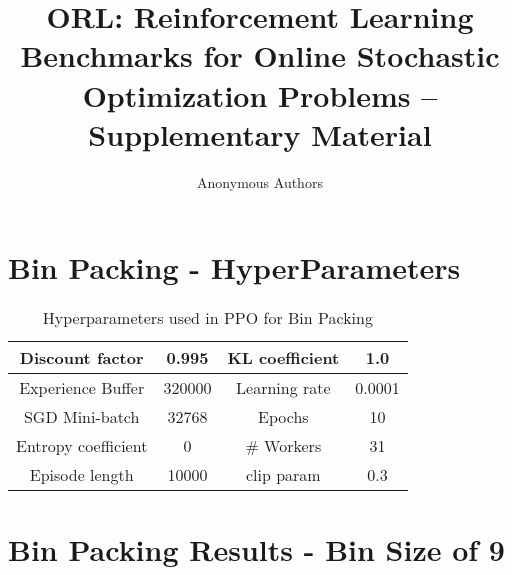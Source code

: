\documentclass[letterpaper]{article} %
\title{ORL: Reinforcement Learning Benchmarks for Online Stochastic Optimization Problems -- Supplementary Material}
\author{Anonymous Authors}
\begin{document}
	
\maketitle

	\section{Bin Packing - HyperParameters}
\label{appendix:bin_size_hp}
\begin{table}[h!]
	\resizebox{\columnwidth}{!}
	{
		\centering
		\begin{tabular}{ |c|c|c|c| } 
			\hline
			Discount factor & 0.995 & KL coefficient & 1.0 \\
			\hline
			Experience Buffer & 320000 & Learning rate & 0.0001 \\
			\hline	
			SGD Mini-batch & 32768 & Epochs & 10 \\
			\hline
			Entropy coefficient & 0 & \# Workers & 31 \\
			\hline
			Episode length & 10000 & clip param & 0.3 \\
			\hline
		\end{tabular}
	}
	\caption{Hyperparameters used in PPO for Bin Packing}
	\label{table:bin_packing_hyperparam}
	\vspace{-1em}
\end{table}

\section{Bin Packing Results - Bin Size of 9}
\label{appendix:bin_size_9}
\end{document}
